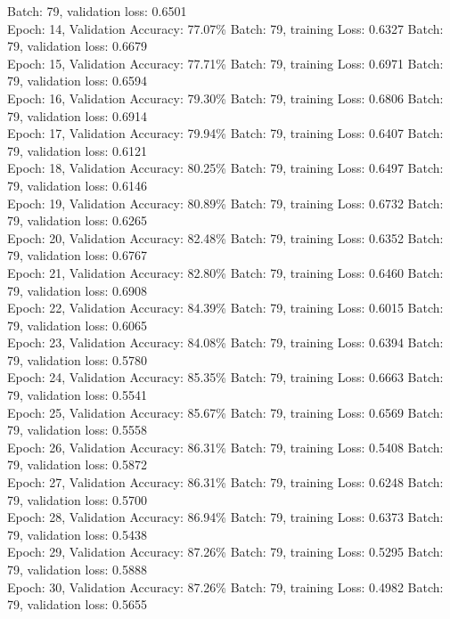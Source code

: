 \documentclass[11pt]{article}
\begin{document}
Batch: 79, validation loss: 0.6501\\
Epoch: 14, Validation Accuracy: 77.07\%
Batch: 79, training Loss: 0.6327
Batch: 79, validation loss: 0.6679\\
Epoch: 15, Validation Accuracy: 77.71\%
Batch: 79, training Loss: 0.6971
Batch: 79, validation loss: 0.6594\\
Epoch: 16, Validation Accuracy: 79.30\%
Batch: 79, training Loss: 0.6806
Batch: 79, validation loss: 0.6914\\
Epoch: 17, Validation Accuracy: 79.94\%
Batch: 79, training Loss: 0.6407
Batch: 79, validation loss: 0.6121\\
Epoch: 18, Validation Accuracy: 80.25\%
Batch: 79, training Loss: 0.6497
Batch: 79, validation loss: 0.6146\\
Epoch: 19, Validation Accuracy: 80.89\%
Batch: 79, training Loss: 0.6732
Batch: 79, validation loss: 0.6265\\
Epoch: 20, Validation Accuracy: 82.48\%
Batch: 79, training Loss: 0.6352
Batch: 79, validation loss: 0.6767\\
Epoch: 21, Validation Accuracy: 82.80\%
Batch: 79, training Loss: 0.6460
Batch: 79, validation loss: 0.6908\\
Epoch: 22, Validation Accuracy: 84.39\%
Batch: 79, training Loss: 0.6015
Batch: 79, validation loss: 0.6065\\
Epoch: 23, Validation Accuracy: 84.08\%
Batch: 79, training Loss: 0.6394
Batch: 79, validation loss: 0.5780\\
Epoch: 24, Validation Accuracy: 85.35\%
Batch: 79, training Loss: 0.6663
Batch: 79, validation loss: 0.5541\\
Epoch: 25, Validation Accuracy: 85.67\%
Batch: 79, training Loss: 0.6569
Batch: 79, validation loss: 0.5558\\
Epoch: 26, Validation Accuracy: 86.31\%
Batch: 79, training Loss: 0.5408
Batch: 79, validation loss: 0.5872\\
Epoch: 27, Validation Accuracy: 86.31\%
Batch: 79, training Loss: 0.6248
Batch: 79, validation loss: 0.5700\\
Epoch: 28, Validation Accuracy: 86.94\%
Batch: 79, training Loss: 0.6373
Batch: 79, validation loss: 0.5438\\
Epoch: 29, Validation Accuracy: 87.26\%
Batch: 79, training Loss: 0.5295
Batch: 79, validation loss: 0.5888\\
Epoch: 30, Validation Accuracy: 87.26\%
Batch: 79, training Loss: 0.4982
Batch: 79, validation loss: 0.5655\\
\end{document}

